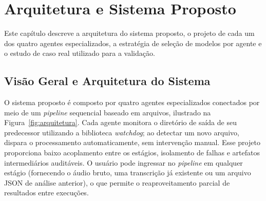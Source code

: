 
\chapter{Arquitetura e Sistema Proposto}
\label{cap:arquitetura}

Este capítulo descreve a arquitetura do sistema proposto, o projeto de cada um dos quatro agentes especializados, a estratégia de seleção de modelos por agente e o estudo de caso real utilizado para a validação.

\section{Visão Geral e Arquitetura do Sistema}

O sistema proposto é composto por quatro agentes especializados conectados por meio de um \textit{pipeline} sequencial baseado em arquivos, ilustrado na Figura~\ref{fig:arquitetura}. Cada agente monitora o diretório de saída de seu predecessor utilizando a biblioteca \textit{watchdog}; ao detectar um novo arquivo, dispara o processamento automaticamente, sem intervenção manual. Esse projeto proporciona baixo acoplamento entre os estágios, isolamento de falhas e artefatos intermediários auditáveis. O usuário pode ingressar no \textit{pipeline} em qualquer estágio (fornecendo o áudio bruto, uma transcrição já existente ou um arquivo JSON de análise anterior), o que permite o reaproveitamento parcial de resultados entre execuções.


